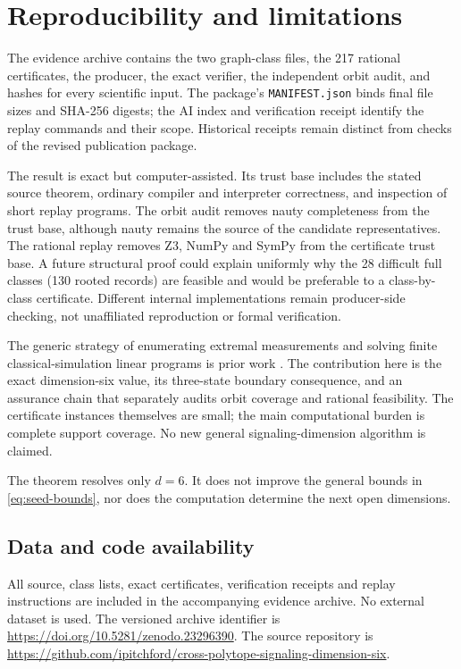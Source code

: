 \documentclass[11pt]{article}
\begin{document}
\section{Reproducibility and limitations}

The evidence archive contains the two graph-class files, the 217 rational
certificates, the producer, the exact verifier, the independent orbit audit,
and hashes for every scientific input. The package's \texttt{MANIFEST.json}
binds final file sizes and SHA-256 digests; the AI index and verification
receipt identify the replay commands and their scope. Historical receipts
remain distinct from checks of the revised publication package.

The result is exact but computer-assisted. Its trust base includes the stated
source theorem, ordinary compiler and interpreter correctness, and inspection
of short replay programs. The orbit audit removes nauty completeness from the
trust base, although nauty remains the source of the candidate representatives.
The rational replay removes Z3, NumPy and SymPy from the certificate trust
base. A future structural proof could explain uniformly why the 28 difficult
full classes (130 rooted records) are feasible and would be preferable to
a class-by-class certificate. Different internal implementations remain
producer-side checking, not unaffiliated reproduction or formal verification.

The generic strategy of enumerating extremal measurements and solving finite
classical-simulation linear programs is prior work
\cite{DallArnoTosiniBuscemi,KaiDallArno}. The contribution here is the exact
dimension-six value, its three-state boundary consequence, and an assurance
chain that separately audits orbit coverage and rational feasibility. The
certificate instances themselves are small; the main computational burden is
complete support coverage. No new general signaling-dimension algorithm is
claimed.

The theorem resolves only $d=6$. It does not improve the general bounds in
\eqref{eq:seed-bounds}, nor does the computation determine the next open
dimensions.

\subsection*{Data and code availability}
All source, class lists, exact certificates, verification receipts and replay
instructions are included in the accompanying evidence archive. No external
dataset is used.
The versioned archive identifier is
\url{https://doi.org/10.5281/zenodo.23296390}.
The source repository is
\url{https://github.com/ipitchford/cross-polytope-signaling-dimension-six}.
\end{document}
